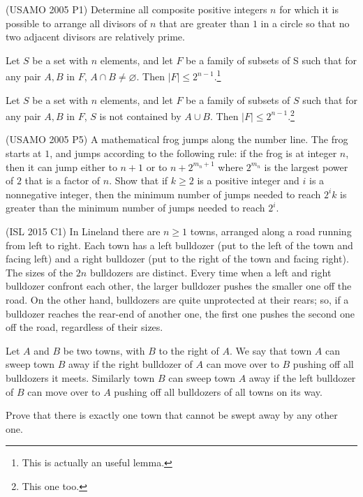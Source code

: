 \documentclass[12pt,a4paper]{article}
\begin{document}
		\begin{problem}(USAMO 2005 P1)
			Determine all composite positive integers $n$ for which it is possible to arrange all divisors of $n$ that are greater than $ 1 $ in a circle so that no two adjacent divisors are relatively prime.
		\end{problem}
	
		\begin{problem}
			Let $ S $ be a set with $ n $ elements, and let $ F $ be a family of subsets of S such that for any pair $ A, B $ in $ F $, $ A \cap B \not= \varnothing $. Then $ |F| \leq 2^{n-1} $.\footnote{This is actually an useful lemma.}
		\end{problem}
		
		\begin{problem}
			Let $ S $ be a set with $ n $ elements, and let $ F $ be a family of subsets of $ S $ such that for any pair $ A, B $ in $ F $, $ S $ is not contained by $ A \cup B $. Then $ |F| \leq 2^{n-1} $.\footnote{This one too.}
		\end{problem}
		
		\begin{problem}(USAMO 2005 P5)
			A mathematical frog jumps along the number line. The frog starts at $1$, and jumps according to the following rule: if the frog is at integer $n$, then it can jump either to $n+1$ or to $n + 2^{m_n+1}$ where $2^{m_n}$ is the largest power of $2$ that is a factor of $n$. Show that if $k \geq 2$ is a positive integer and $i$ is a nonnegative integer, then the minimum number of jumps needed to reach $2^ik$ is greater than the minimum number of jumps needed to reach $2^i.$
		\end{problem}
	
		\begin{problem}(ISL 2015 C1)
			In Lineland there are $n\geq1$ towns, arranged along a road running from left to right. Each town has a left bulldozer (put to the left of the town and facing left) and a right bulldozer (put to the right of the town and facing right). The sizes of the $2n$ bulldozers are distinct. Every time when a left and right bulldozer confront each other, the larger bulldozer pushes the smaller one off the road. On the other hand, bulldozers are quite unprotected at their rears; so, if a bulldozer reaches the rear-end of another one, the first one pushes the second one off the road, regardless of their sizes.
			
			Let $A$ and $B$ be two towns, with $B$ to the right of $A$. We say that town $A$ can sweep town $B$ away if the right bulldozer of $A$ can move over to $B$ pushing off all bulldozers it meets. Similarly town $B$ can sweep town $A$ away if the left bulldozer of $B$ can move over to $A$ pushing off all bulldozers of all towns on its way.
			
			Prove that there is exactly one town that cannot be swept away by any other one.
		\end{problem}
		
\end{document}
